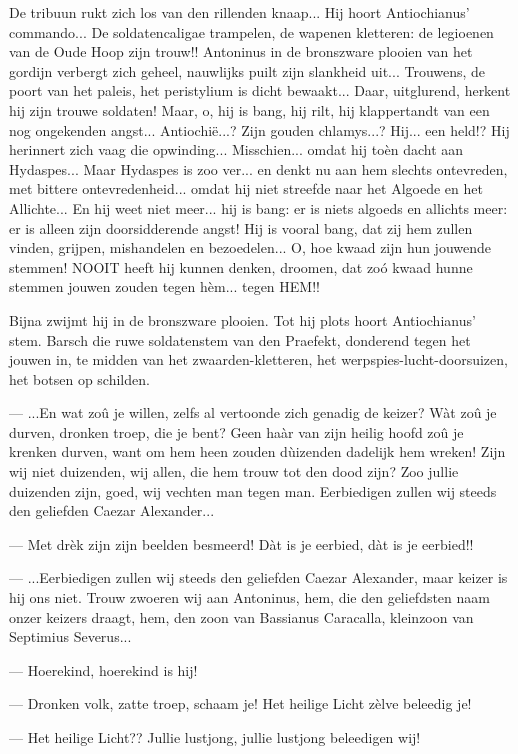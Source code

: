 \documentclass[a4paper, 12pt, oneside, dutch]{article}
\begin{document}
De tribuun rukt zich los van den rillenden knaap... Hij hoort Antiochianus' commando... De soldatencaligae trampelen, de wapenen kletteren: de legioenen van de Oude Hoop zijn trouw!! Antoninus in de bronszware plooien van het gordijn verbergt zich geheel, nauwlijks puilt zijn slankheid uit... Trouwens, de poort van het paleis, het peristylium is dicht bewaakt... Daar, uitglurend, herkent hij zijn trouwe soldaten! Maar, o, hij is bang, hij rilt, hij klappertandt van een nog ongekenden angst... Antiochië...? Zijn gouden chlamys...? Hij... een held!? Hij herinnert zich vaag die opwinding... Misschien... omdat hij toèn dacht aan Hydaspes... Maar Hydaspes is zoo ver... en denkt nu aan hem slechts ontevreden, met bittere ontevredenheid... omdat hij niet streefde naar het Algoede en het Allichte... En hij weet niet meer... hij is bang: er is niets algoeds en allichts meer: er is alleen zijn doorsidderende angst! Hij is vooral bang, dat zij hem zullen vinden, grijpen, mishandelen en bezoedelen... O, hoe kwaad zijn hun jouwende stemmen! NOOIT heeft hij kunnen denken, droomen, dat zoó kwaad hunne stemmen jouwen zouden tegen hèm... tegen HEM!!

Bijna zwijmt hij in de bronszware plooien. Tot hij plots hoort Antiochianus' stem. Barsch die ruwe soldatenstem van den Praefekt, donderend tegen het jouwen in, te midden van het zwaarden-kletteren, het werpspies-lucht-doorsuizen, het botsen op schilden.

--- ...En wat zoû je willen, zelfs al vertoonde zich genadig de keizer? Wàt zoû je durven, dronken troep, die je bent? Geen haàr van zijn heilig hoofd zoû je krenken durven, want om hem heen zouden dùizenden dadelijk hem wreken! Zijn wij niet duizenden, wij allen, die hem trouw tot den dood zijn? Zoo jullie duizenden zijn, goed, wij vechten man tegen man. Eerbiedigen zullen wij steeds den geliefden Caezar Alexander...

--- Met drèk zijn zijn beelden besmeerd! Dàt is je eerbied, dàt is je eerbied!!

--- ...Eerbiedigen zullen wij steeds den geliefden Caezar Alexander, maar keizer is hij ons niet. Trouw zwoeren wij aan Antoninus, hem, die den geliefdsten naam onzer keizers draagt, hem, den zoon van Bassianus Caracalla, kleinzoon van Septimius Severus...

--- Hoerekind, hoerekind is hij!

--- Dronken volk, zatte troep, schaam je! Het heilige Licht zèlve beleedig je!

--- Het heilige Licht?? Jullie lustjong, jullie lustjong beleedigen wij!
\end{document}
